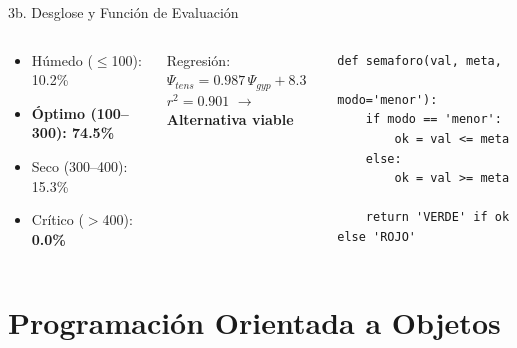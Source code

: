 \documentclass[11pt, aspectratio=169]{beamer}
\begin{document}
\begin{frame}[fragile]{3b. Desglose y Función de Evaluación}
\begin{columns}[c]
\begin{tcolorbox}[colback=SmartGreen!12,colframe=SmartGreen,
    arc=4pt,left=6pt,right=6pt,top=4pt,bottom=4pt,
    title={\color{white}Distribución Hídrica Real}]
\begin{itemize}
    \item Húmedo ($\leq$100): 10.2\%
    \item \textbf{Óptimo (100--300): 74.5\%}
    \item Seco (300--400): 15.3\%
    \item Crítico ($>$400): \textbf{0.0\%}
\end{itemize}
\end{tcolorbox}

\begin{tcolorbox}[colback=SmartLightBlue!12,colframe=SmartLightBlue,
    arc=4pt,left=6pt,right=6pt,top=4pt,bottom=4pt,
    title={\color{white}Validación del Sensor Gypsum}]
Regresión: $\Psi_{tens} = 0.987\,\Psi_{gyp} + 8.3$\\
$r^2 = 0.901$ \quad $\rightarrow$ \textbf{Alternativa viable}
\end{tcolorbox}

\begin{tcolorbox}[colback=SmartOrange!12,colframe=SmartOrange,
    arc=4pt,left=6pt,right=6pt,top=4pt,bottom=4pt,
    title={\color{white}Función de Evaluación Python}]
\begin{lstlisting}[numbers=none,frame=none,backgroundcolor={\color{SmartOrange!8}},basicstyle=\ttfamily\small]
def semaforo(val, meta,
             modo='menor'):
    if modo == 'menor':
        ok = val <= meta
    else:
        ok = val >= meta
        
    return 'VERDE' if ok else 'ROJO'
\end{lstlisting}
\end{tcolorbox}
\end{columns}
\end{frame}

\section{Programación Orientada a Objetos}
\end{document}
